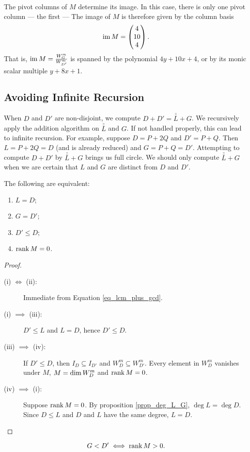 The pivot columns of $M$ determine its image.
In this case, there is only one pivot column --- the first ---
The image of $M$ is therefore given by the column basis
\[ \operatorname{im} M = \begin{pmatrix}
  4  \\
  10 \\
  4  
\end{pmatrix}. \]
That is, $\operatorname{im} M = \frac {W_G^m}{W_{D'}^m}$ is spanned by the polynomial $4y + 10x + 4$,
or by its monic scalar multiple $y + 8x + 1$.




\subsection{Avoiding Infinite Recursion}

When $D$ and $D'$ are non-disjoint, we compute $D + D' = \bar{\bar L} + G$.
We recursively apply the addition algorithm on $\bar{\bar L}$ and $G$.
If not handled properly, this can lead to infinite recursion.
For example, suppose $D = P + 2Q$ and $D' = P + Q$.
Then $L = P + 2Q = D$ (and is already reduced) and $G = P + Q = D'$.
Attempting to compute $D + D'$ by $\bar{\bar L} + G$ brings us full circle.
We should only compute $\bar{\bar L} + G$ when we are certain that $L$ and $G$ are distinct from $D$ and $D'$.

\begin{proposition}
  \label{prop_rank_M}
  The following are equivalent:
  \begin{enumerate}[label=(\roman*)]
    \item $L = D$;
    \item $G = D'$;
    \item $D' \leq D$;
    \item $\operatorname{rank} M = 0$.
  \end{enumerate}
\end{proposition}
\begin{proof}
  \begin{description}
    \item[(i) $\iff$ (ii):]
      Immediate from Equation \ref{eq_lcm_plus_gcd}.
    \item[(i) $\implies$ (iii):]
      $D' \leq L$ and $L = D$, hence $D' \leq D$.
    \item[(iii) $\implies$ (iv):]
      If $D' \leq D$, then $I_D \subseteq I_{D'}$ and $W_D^m \subseteq W_{D'}^m$.
      Every element in $W_D^m$ vanishes under $M$,
      $\null M = \dim W_D^m$ and $\operatorname{rank} M = 0$.
    \item[(iv) $\implies$ (i):]
      Suppose $\operatorname{rank} M = 0$.
      By proposition \ref{prop_deg_L_G}, $\deg L = \deg D$.
      Since $D \leq L$ and $D$ and $L$ have the same degree, $L = D$.
  \end{description}
\end{proof}
\begin{corollary}
  \[ G < D' \iff \operatorname{rank} M > 0. \]
\end{corollary}

